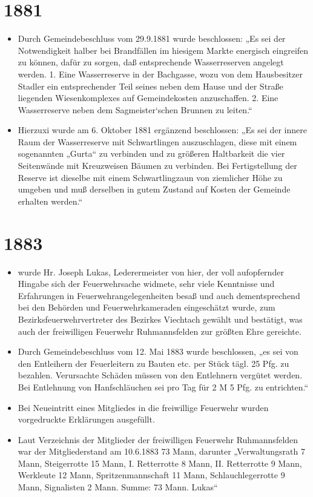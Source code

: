 \documentclass[12pt,a4paper]{book}
\begin{document}
\section*{1881}

\begin{itemize}
\item Durch Gemeindebeschluss vom 29.9.1881 wurde beschlossen: „Es sei der
Notwendigkeit halber bei Brandfällen im hiesigem Markte energisch eingreifen zu
können, dafür zu sorgen, daß entsprechende Wasserreserven angelegt werden. 1.
Eine Wasserreserve in der Bachgasse, wozu von dem Hausbesitzer Stadler ein
entsprechender Teil seines neben dem Hause und der Straße liegenden
Wiesenkomplexes auf Gemeindekosten anzuschaffen. 2. Eine Wasserreserve neben dem
Sagmeister`schen Brunnen zu leiten.“

\item Hierzuxi wurde am 6. Oktober 1881 ergänzend beschlossen: „Es sei der
innere Raum der Wasserreserve mit Schwartlingen auszuschlagen, diese mit einem
sogenannten „Gurta“ zu verbinden und zu größeren Haltbarkeit die vier
Seitenwände mit Kreuzweisen Bäumen zu verbinden. Bei Fertigstellung der Reserve
ist dieselbe mit einem Schwartlingzaun von ziemlicher Höhe zu umgeben und muß
derselben in gutem Zustand auf Kosten der Gemeinde erhalten werden.“
\end{itemize}

\section*{1883}

\begin{itemize}
\item wurde Hr. Joseph Lukas, Lederermeister von hier, der voll aufopfernder
Hingabe sich der Feuerwehrsache widmete, sehr viele Kenntnisse und Erfahrungen
in Feuerwehrangelegenheiten besaß und auch dementsprechend bei den Behörden und
Feuerwehrkameraden eingeschätzt wurde, zum Bezirksfeuerwehrvertreter des
Bezirkes Viechtach gewählt und bestätigt, was auch der freiwilligen Feuerwehr
Ruhmannsfelden zur größten Ehre gereichte.

\item Durch Gemeindebeschluss vom 12. Mai 1883 wurde beschlossen, „es sei von
den Entleihern der Feuerleitern zu Bauten etc. per Stück tägl. 25 Pfg. zu
bezahlen. Verursachte Schäden müssen von den Entlehnern vergütet werden. Bei
Entlehnung von Hanfschläuchen sei pro Tag für 2 M 5 Pfg. zu entrichten.“

\item Bei Neueintritt eines Mitgliedes in die freiwillige Feuerwehr wurden
vorgedruckte Erklärungen ausgefüllt.

\item Laut Verzeichnis der Mitglieder der freiwilligen Feuerwehr Ruhmannsfelden
war der Mitgliederstand am 10.6.1883 73 Mann, darunter „Verwaltungsrath 7 Mann,
Steigerrotte 15 Mann, I. Retterrotte 8 Mann, II. Retterrotte 9 Mann, Werkleute
12 Mann, Spritzenmannschaft 11 Mann, Schlauchlegerrotte 9 Mann, Signalisten 2
Mann. Summe: 73 Mann. Lukas“
\end{itemize}
\end{document}
